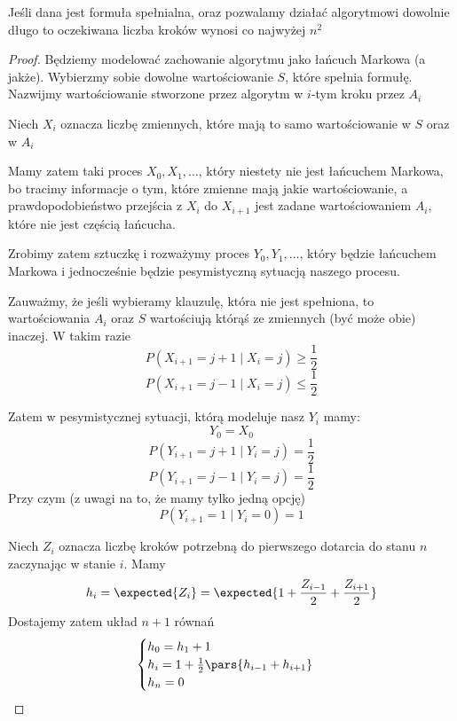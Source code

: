 \begin{theorem}[Lemat 7.1 P\&C]
    Jeśli dana jest formuła spełnialna, oraz pozwalamy działać algorytmowi dowolnie długo 
    to oczekiwana liczba kroków wynosi co najwyżej \( n^2 \)
\end{theorem}
\begin{proof}
    Będziemy modelować zachowanie algorytmu jako łańcuch Markowa (a jakże).
    Wybierzmy sobie dowolne wartościowanie \( S \), które spełnia formułę.
    Nazwijmy wartościowanie stworzone przez algorytm w \(i\)-tym kroku przez \( A_i \)
    
    Niech \( X_i \) oznacza liczbę zmiennych, które mają to samo wartościowanie w \( S \) oraz w \( A_i \)
    
    Mamy zatem taki proces \( X_0, X_1, \dots \), który niestety nie jest łańcuchem Markowa, bo tracimy informacje o tym, które zmienne mają jakie wartościowanie, a prawdopodobieństwo przejścia z \( X_i \) do \( X_{i+1} \) jest zadane wartościowaniem \( A_i \), które nie jest częścią łańcucha.
    
    Zrobimy zatem sztuczkę i rozważymy proces \( Y_0, Y_1, \dots \), który będzie łańcuchem Markowa i jednocześnie będzie pesymistyczną sytuacją naszego procesu.
    
    Zauważmy, że jeśli wybieramy klauzulę, która nie jest spełniona, to wartościowania \( A_i \) oraz \( S \) wartościują którąś ze zmiennych (być może obie) inaczej.
    W takim razie
    \[
        P(X_{i+1} = j + 1 \mid X_i = j) \geq \frac{1}{2}
    \]
    \[
        P(X_{i+1} = j - 1 \mid X_i = j) \leq \frac{1}{2}
    \]
    
    Zatem w pesymistycznej sytuacji, którą modeluje nasz \( Y_i \) mamy:
    \[
        Y_0 = X_0
    \]
    \[
        P(Y_{i+1} = j + 1 \mid Y_i = j) = \frac{1}{2}
    \]
    \[
        P(Y_{i+1} = j - 1 \mid Y_i = j) = \frac{1}{2}
    \]
    Przy czym (z uwagi na to, że mamy tylko jedną opcję)
    \[
        P(Y_{i+1} = 1 \mid Y_i = 0) = 1
    \]
    
    Niech \( Z_i \) oznacza liczbę kroków potrzebną do pierwszego dotarcia do stanu \( n \) zaczynając w stanie \( i \).
    Mamy
    \[
        h_i = \expected{Z_i} = \expected{1 + \frac{Z_{i-1}}{2} + \frac{Z_{i+1}}{2}}
    \]
    Dostajemy zatem układ \( n + 1 \) równań
    \[
        \begin{cases}
            h_0 = h_1 + 1 \\
            h_i = 1 + \frac{1}{2}\pars{h_{i-1} + h_{i+1}} \\
            h_n = 0 
        \end{cases}
    \]
    

\end{proof}
